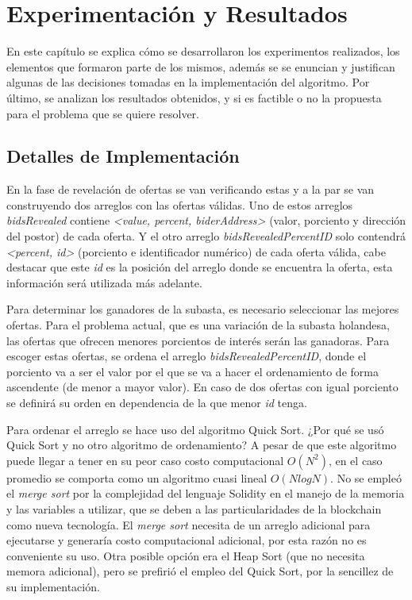 \chapter{Experimentación y Resultados}\label{chapter:implementation}

En este capítulo se explica cómo se desarrollaron los experimentos realizados, los elementos que formaron 
parte de los mismos, además se se enuncian y justifican algunas de las decisiones tomadas en la implementación
del algoritmo. Por último, se analizan los resultados obtenidos, y si es factible o no la propuesta
para el problema que se quiere resolver.

\section{Detalles de Implementación}
  En la fase de revelación de ofertas se van verificando estas y a la par se van construyendo dos arreglos con las ofertas válidas. Uno de estos arreglos \textit{bidsRevealed} contiene 
  \textit{<value, percent, biderAddress>} (valor, porciento y dirección del postor) de cada oferta. Y
  el otro arreglo \textit{bidsRevealedPercentID} solo contendrá \textit{<percent, id>} (porciento e 
  identificador numérico) de cada oferta válida, cabe destacar que este \textit{id} es la posición del
  arreglo donde se encuentra la oferta, esta información será utilizada más adelante.

  Para determinar los ganadores de la subasta, es necesario seleccionar las mejores ofertas. Para el
  problema actual, que es una variación de la subasta holandesa, las ofertas que ofrecen menores
  porcientos de interés serán las ganadoras. Para escoger estas ofertas, se ordena el arreglo
  \textit{bidsRevealedPercentID}, donde el porciento va a ser el valor por el que se va a hacer el 
  ordenamiento de forma ascendente (de menor a mayor valor). En caso de dos ofertas con igual porciento
  se definirá su orden en dependencia de la que menor \textit{id} tenga.

  Para ordenar el arreglo se hace uso del algoritmo Quick Sort. ¿Por qué se usó Quick Sort y no otro 
  algoritmo de ordenamiento? A pesar de que este algoritmo puede llegar a tener en su peor caso costo
  computacional $O(N^2)$, en el caso promedio se comporta como un algoritmo cuasi lineal $O(N log N)$.
  No se empleó el \textit{merge sort} por la complejidad del lenguaje Solidity en el manejo de la memoria
  y las variables a utilizar, que se deben a las particularidades de la blockchain como nueva tecnología.
  El \textit{merge sort} necesita de un arreglo adicional para ejecutarse y generaría costo 
  computacional adicional, por esta razón no es conveniente su uso. Otra posible opción era el Heap Sort 
  (que no necesita memora adicional), pero 
  se prefirió el empleo del Quick Sort, por la sencillez de su implementación.

